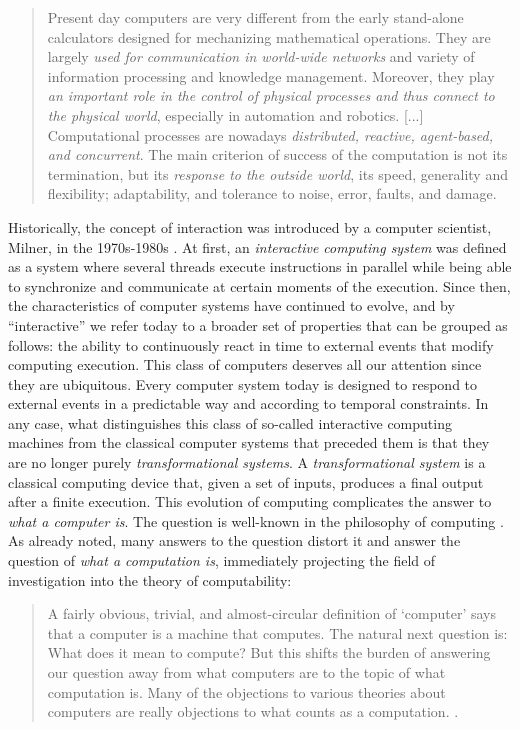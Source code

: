 \documentclass[a4paper, 11pt, twoside]{article}
\begin{document}
\begin{quote}
 Present day computers are very different from the early stand-alone calculators designed for mechanizing mathematical operations. They are largely \emph{used for communication in world-wide networks} and variety of information processing and knowledge management. Moreover, they play \emph{an important role in the control of physical processes and thus connect to the physical world}, especially in automation and robotics. [...] Computational processes are nowadays \emph{distributed, reactive, agent-based, and concurrent}. The main criterion of success of the computation is not its termination, but its \emph{response to the outside world}, its speed, generality and flexibility; adaptability, and tolerance to noise, error, faults, and damage. \parencite{Dodig-Crnkovic2011}  \end{quote}

Historically, the concept of interaction was introduced by a computer scientist, Milner, in the 1970s-1980s \parencite{Milner1975, Milner1982, Milner1993, Milner1999}. At first, an \emph{interactive computing system} was defined as a system where several threads execute instructions in parallel while being able to synchronize and communicate at certain moments of the execution. Since then, the characteristics of computer systems have continued to evolve, and by ``interactive'' we refer today to a broader set of properties that can be grouped as follows: the ability to continuously react in time to external events that modify computing execution. 
This class of computers deserves all our attention since they are ubiquitous. Every computer system today is designed to respond to external events in a predictable way and according to temporal constraints. In any case, what distinguishes this class of so-called interactive computing machines from the classical computer systems that preceded them is that they are no longer purely \emph{transformational systems}. A \emph{transformational system} is a classical computing device that, given a set of inputs, produces a final output after a finite execution. 
This evolution of computing complicates the answer to \textit{what a computer is}. The question is well-known in the philosophy of computing \parencite{Piccinini2008, Rapaport2018, Smith2002}. As already noted, many answers to the question distort it and answer the question of \textit{what a computation is}, immediately projecting the field of investigation into the theory of computability: 


\begin{quote}
A fairly obvious, trivial, and almost-circular definition of ‘computer’ says that a computer is a machine that computes. The natural next question is: What does it mean to compute? But this shifts the burden of answering our question away from what computers are to the topic of what computation is. Many of the objections to various theories about computers are really objections to what counts as a computation. \parencite{Rapaport2018}. 
\end{quote}
\end{document}
